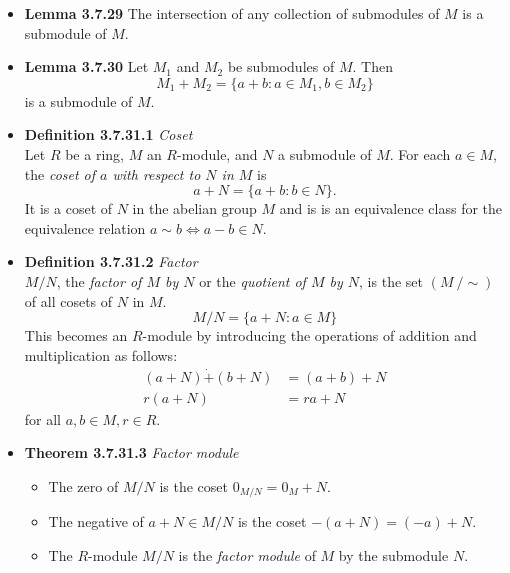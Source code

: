\documentclass[11pt,a4paper]{article}
\begin{document}
\begin{itemize}
    \item \textbf{Lemma 3.7.29} The intersection of any collection of submodules of $M$ is a
        submodule of $M$.

    \item \textbf{Lemma 3.7.30} Let $M_1$ and $M_2$ be submodules of $M$.
        Then
        \[
            M_1 + M_2 = \{ a + b : a \in M_1, b \in M_2 \}
        \]
        is a submodule of $M$.

    \item \textbf{Definition 3.7.31.1} \emph{Coset} \\
        Let $R$ be a ring, $M$ an $R$-module, and $N$ a submodule of $M$.
        For each $a \in M$, the \emph{coset of $a$ with respect to $N$ in $M$} is
        \[
            a + N = \{ a + b : b \in N \}.
        \]
        It is a coset of $N$ in the abelian group $M$ and is is an equivalence class for the
        equivalence relation $a \sim b \iff a-b \in N$.

    \item \textbf{Definition 3.7.31.2} \emph{Factor} \\
        $M/N$, the \emph{factor of $M$ by $N$} or the \emph{quotient of $M$ by $N$},
        is the set $(M \ / \sim)$ of all cosets of $N$ in $M$.
        \[
            M/N = \{ a + N : a \in M \}
        \]
        This becomes an $R$-module by introducing the operations of addition and multiplication
        as follows:
        \begin{align*}{}
            (a + N) \dot{+} (b + N) & = (a + b) + N \\
            r(a + N)                & = ra + N
        \end{align*}
        for all $a, b \in M, r \in R$.

    \item \textbf{Theorem 3.7.31.3} \emph{Factor module}
        \begin{itemize}
            \item The zero of $M/N$ is the coset $0_{M/N} = 0_M + N$.
            \item The negative of $a + N \in M/N$ is the coset $-(a+N) = (-a)+N$.
            \item The $R$-module $M/N$ is the \emph{factor module} of $M$ by the submodule $N$.
        \end{itemize}


\end{itemize}
\end{document}
